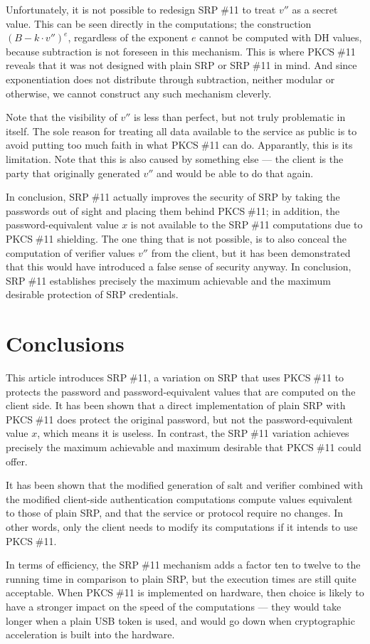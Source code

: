 \documentclass[a4paper,11pt]{article}
\def\pkcs11{PKCS$\;$\#11\xspace}
\def\srp11{SRP$\;$\#11\xspace}
\begin{document}
Unfortunately, it is not possible to redesign \srp11 to treat $v''$ as a secret value.  This can be seen directly in the computations; the construction $(B-k\cdot v'')^e$, regardless of the exponent $e$ cannot be computed with DH values, because subtraction is not foreseen in this mechanism.  This is where \pkcs11 reveals that it was not designed with plain SRP or \srp11 in mind.  And since exponentiation does not distribute through subtraction, neither modular or otherwise, we cannot construct any such mechanism cleverly.

Note that the visibility of $v''$ is less than perfect, but not truly problematic in itself.  The sole reason for treating all data available to the service as public is to avoid putting too much faith in what \pkcs11 can do.  Apparantly, this is its limitation.  Note that this is also caused by something else --- the client is the party that originally generated $v''$ and would be able to do that again.

In conclusion, \srp11 actually improves the security of SRP by taking the passwords out of sight and placing them behind \pkcs11; in addition, the password-equivalent value $x$ is not available to the \srp11 computations due to \pkcs11 shielding.  The one thing that is not possible, is to also conceal the computation of verifier values $v''$ from the client, but it has been demonstrated that this would have introduced a false sense of security anyway.  In conclusion, \srp11 establishes precisely the maximum achievable and the maximum desirable protection of SRP credentials.


\section{Conclusions}

This article introduces \srp11, a variation on SRP that uses \pkcs11 to protects the password and password-equivalent values that are computed on the client side.  It has been shown that a direct implementation of plain SRP with \pkcs11 does protect the original password, but not the password-equivalent value $x$, which means it is useless.  In contrast, the \srp11 variation achieves precisely the maximum achievable and maximum desirable that \pkcs11 could offer.

It has been shown that the modified generation of salt and verifier combined with the modified client-side authentication computations compute values equivalent to those of plain SRP, and that the service or protocol require no changes.  In other words, only the client needs to modify its computations if it intends to use \pkcs11.

In terms of efficiency, the \srp11 mechanism adds a factor ten to twelve to the running time in comparison to plain SRP, but the execution times are still quite acceptable.  When \pkcs11 is implemented on hardware, then choice is likely to have a stronger impact on the speed of the computations --- they would take longer when a plain USB token is used, and would go down when cryptographic acceleration is built into the hardware.
\end{document}
